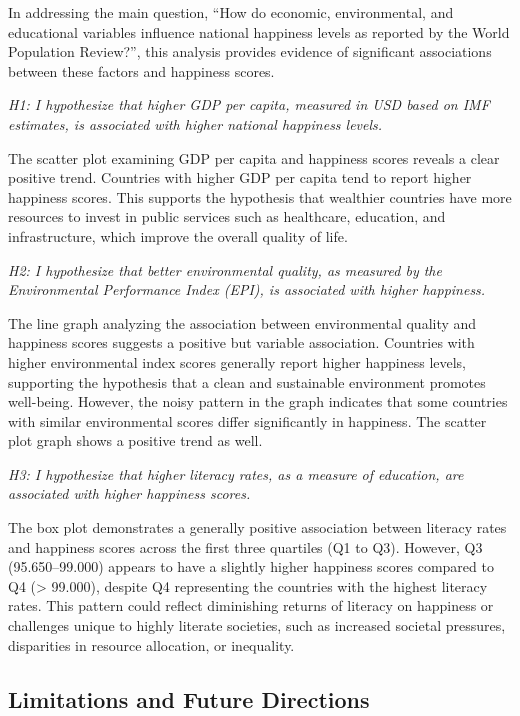 \documentclass[
]{article}
\begin{document}
In addressing the main question, ``How do economic, environmental, and
educational variables influence national happiness levels as reported by
the World Population Review?'', this analysis provides evidence of
significant associations between these factors and happiness scores.

\emph{H1: I hypothesize that higher GDP per capita, measured in USD
based on IMF estimates, is associated with higher national happiness
levels.}

The scatter plot examining GDP per capita and happiness scores reveals a
clear positive trend. Countries with higher GDP per capita tend to
report higher happiness scores. This supports the hypothesis that
wealthier countries have more resources to invest in public services
such as healthcare, education, and infrastructure, which improve the
overall quality of life.

\emph{H2: I hypothesize that better environmental quality, as measured
by the Environmental Performance Index (EPI), is associated with higher
happiness.}

The line graph analyzing the association between environmental quality
and happiness scores suggests a positive but variable association.
Countries with higher environmental index scores generally report higher
happiness levels, supporting the hypothesis that a clean and sustainable
environment promotes well-being. However, the noisy pattern in the graph
indicates that some countries with similar environmental scores differ
significantly in happiness. The scatter plot graph shows a positive
trend as well.

\emph{H3: I hypothesize that higher literacy rates, as a measure of
education, are associated with higher happiness scores.}

The box plot demonstrates a generally positive association between
literacy rates and happiness scores across the first three quartiles (Q1
to Q3). However, Q3 (95.650--99.000) appears to have a slightly higher
happiness scores compared to Q4 (\textgreater{} 99.000), despite Q4
representing the countries with the highest literacy rates. This pattern
could reflect diminishing returns of literacy on happiness or challenges
unique to highly literate societies, such as increased societal
pressures, disparities in resource allocation, or inequality.

\hypertarget{limitations-and-future-directions}{%
\subsection{Limitations and Future
Directions}\label{limitations-and-future-directions}}
\end{document}
